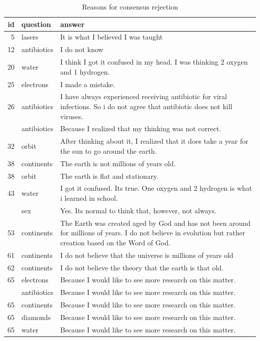 \documentclass[
  doc,floatsintext]{apa6}
\begin{document}
\begin{longtable}[t]{>{}r>{}l>{\raggedright\arraybackslash}p{30em}}
\caption{\label{tab:exp3-reasons-rejection}Reasons for consensus rejection}\\
\toprule
id & question & answer\\
\midrule
5 & lasers & It is what I believed I was taught\\
12 & antibiotics & I do not know\\
20 & water & I think I got it confused in my head. I was thinking 2 oxygen and 1 hydrogen.\\
25 & electrons & I made a mistake.\\
26 & antibiotics & I have always experienced receiving antibiotic for viral infections. So i do not agree that antibiotic does not kill viruses.\\
\addlinespace
32 & antibiotics & Because I realized that my thinking was not correct.\\
32 & orbit & After thinking about it, I realized  that it does take a year for the sun to go around the earth.\\
38 & continents & The earth is not millions of years old.\\
38 & orbit & The earth is flat and stationary.\\
43 & water & I got it confused. Its true. One oxygen and  2 hydrogen is what i learned in school.\\
\addlinespace
46 & sex & Yes.  Its normal to think that, however, not always.\\
53 & continents & The Earth was created aged by God and has not been around for millions of years. I do not believe in evolution but rather creation based on the Word of God.\\
61 & continents & I do not believe that the universe is millions of years old\\
62 & continents & I do not believe the theory that the earth is that old.\\
65 & electrons & Because I would like to see more research on this matter.\\
\addlinespace
65 & antibiotics & Because I would like to see more research on this matter.\\
65 & continents & Because I would like to see more research on this matter.\\
65 & diamonds & Because I would like to see more research on this matter.\\
65 & water & Because I would like to see more research on this matter.\\

\end{longtable}
\end{document}
